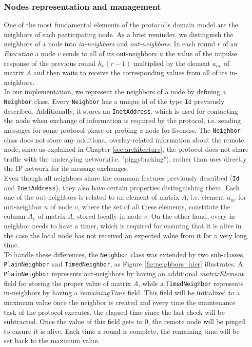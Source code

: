 \documentclass[a4paper,11pt,twoside]{report}
\newcommand{\classname}[1]{\texttt{#1}}
\begin{document}
\subsubsection*{Nodes representation and management}

One of the most fundamental elements of the protocol's domain model are the neighbors of each participating node. As a brief reminder, we distinguish the neighbors of a node into \textit{in-neighbors} and \textit{out-neighbors}. In each round $r$ of an \textit{Execution} a node $v$ sends to all of its out-neighbors $u$ the value of the impulse response of the previous round $h_v(r-1)$ multiplied by the element $a_{uv}$ of matrix $A$ and then waits to receive the corresponding values from all of its in-neighbors.  \\

In our implementation, we represent the neighbors of a node by defining a \classname{Neighbor} class. Every \classname{Neighbor} has a unique id of the type \classname{Id} previously described. Additionally, it stores an \classname{InetAddress}, which is used for contacting the node when exchange of information is required by the protocol, i.e. sending messages for some protocol phase or probing a node for liveness. The \classname{Neighbor} class does not store any additional overlay-related information about the remote node, since as explained in Chapter \ref{sec:architecture}, the protocol does not share traffic with the underlying network(i.e. "piggybacking"), rather than uses directly the IP network for its message exchanges.\\

Even though all neighbors share the common features previously described (\classname{Id} and \classname{InetAddress}), they also have certain properties distinguishing them. Each one of the out-neighbors is related to an element of matrix $A$, i.e. element $a_{uv}$ for out-neighbor $u$ of node $v$, where the set of all these elements, constitute the column $A_{v}$ of matrix $A$, stored locally in node $v$. On the other hand, every in-neighbor needs to have a timer, which is required for ensuring that it is alive in the case the local node has not received an expected value from it for a very long time.\\

To handle these differences, the \classname{Neighbor} class was extended by two sub-classes, \classname{PlainNeighbor} and \classname{TimedNeighbor}, as Figure \ref{fig:neighbors_hier} illustrates. A \classname{PlainNeighbor} represents out-neighbors by having an additional \textit{matrixElement} field for storing the proper value of matrix $A$, while a \classname{TimedNeighbor} represents in-neighbors by having a \textit{remainingTime} field. This field will be initialized to a maximum value once the neighbor is created and every time the maintenance task of the protocol executes, the elapsed time since the last check will be subtracted. Once the value of this field gets to 0, the remote node will be pinged to ensure it is alive. Each time a round is complete, the remaining time will be set back to the maximum value. \\
\end{document}
